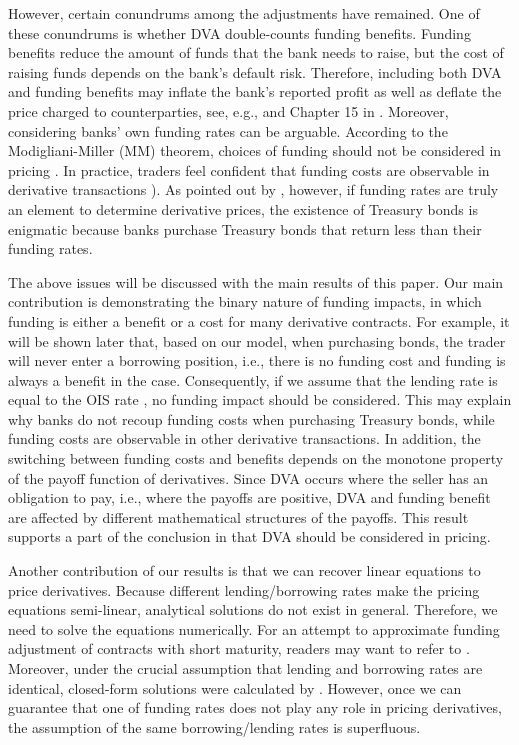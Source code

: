 \documentclass[a4paper, 11pt]{article}              %
\numberwithin{equation}{section}
\theoremstyle{plain}
\newcommand{\1}{\mathds{1}}
\theoremstyle{plain}
\theoremstyle{definition}
\theoremstyle{plain}
\begin{document}
However, certain conundrums among the adjustments have remained. One of these
conundrums is whether DVA double-counts funding benefits. Funding benefits
reduce the amount of funds that the bank needs to raise, but the cost of raising
funds depends on the bank's default risk.  Therefore, including both DVA and
funding benefits may inflate the bank’s reported profit as well as deflate the
price charged to counterparties, see, e.g., \cite{cameron2013black} and Chapter
15 in \cite{gregory2015xva}.  Moreover,  considering banks' own funding rates can be
arguable. According to the Modigliani-Miller (MM) theorem, choices of funding should
not be considered in pricing \citep{modigliani1958cost, stiglitz1969re}.  In
practice, traders feel confident that funding costs are observable in derivative
transactions \citep[see][]{andersen2019funding}).  As pointed out by
\cite{hull2012fva}, however, if funding rates are truly an element to determine
derivative prices, the existence of Treasury bonds is enigmatic because banks
purchase Treasury bonds that return less than their funding rates. 


The above issues will be discussed with the main results of this paper. Our main
contribution is demonstrating the binary nature of funding impacts, in which
funding is either a benefit or a cost for many derivative contracts. For
example, it will be shown later that, based on our model, when purchasing bonds,
the trader will never enter a borrowing position, i.e., there is no funding cost
and funding is always a benefit in the case. Consequently, if we assume that the
lending rate is equal to the OIS rate \citep[for example, as
in][]{burgard2010partial}, no funding impact should be considered. This may
explain why banks do not recoup funding costs when purchasing Treasury bonds,
while funding costs are observable in other derivative transactions. In
addition, the switching between funding costs and benefits depends on the
monotone property of the payoff function of derivatives. Since DVA occurs where
the seller has an obligation to pay, i.e., where the payoffs are positive, DVA
and funding benefit are affected by different mathematical structures of the
payoffs. This result supports a part of the conclusion in
\cite{andersen2019funding} that DVA should be considered in pricing.

Another contribution of our results is that we can recover linear equations to
price derivatives. Because different lending/borrowing rates make the pricing
equations semi-linear, analytical solutions do not exist in general. Therefore,
we need to solve the equations numerically. For an attempt to approximate
funding adjustment of contracts with short maturity, readers may want to refer
to \cite{gobet2015analytical}. Moreover, under the crucial assumption that
lending and borrowing rates are identical, closed-form solutions were calculated
by \citep{piterbarg2010funding, bichuch2017arbitrage, brigo2017funding}.
However, once we can guarantee that one of funding rates does not play any role
in pricing derivatives, the assumption of the same borrowing/lending rates is
superfluous.
\end{document}
